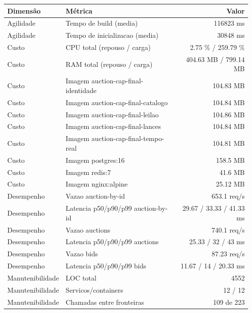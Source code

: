 \begin{quadro}[htb]
  \centering
  \caption{Métricas (auction, capacidade-negocio, snapshot-final).}
  \label{qua:metricas-auction-capacidade-negocio-snapshot-final}
  \renewcommand{\arraystretch}{1.15}
  \begin{tabular}{|l|l|r|}
    \hline
    \textbf{Dimensão} & \textbf{Métrica} & \textbf{Valor} \\
    \hline
    Agilidade & Tempo de build (media) & 116823 ms \\ \hline
    Agilidade & Tempo de inicializacao (media) & 30848 ms \\ \hline
    Custo & CPU total (repouso / carga) & 2.75 \% / 259.79 \% \\ \hline
    Custo & RAM total (repouso / carga) & 404.63 MB / 799.14 MB \\ \hline
    Custo & Imagem auction-cap-final-identidade & 104.83 MB \\ \hline
    Custo & Imagem auction-cap-final-catalogo & 104.84 MB \\ \hline
    Custo & Imagem auction-cap-final-leilao & 104.86 MB \\ \hline
    Custo & Imagem auction-cap-final-lances & 104.84 MB \\ \hline
    Custo & Imagem auction-cap-final-tempo-real & 104.81 MB \\ \hline
    Custo & Imagem postgres:16 & 158.5 MB \\ \hline
    Custo & Imagem redis:7 & 41.6 MB \\ \hline
    Custo & Imagem nginx:alpine & 25.12 MB \\ \hline
    Desempenho & Vazao auction-by-id & 653.1 req/s \\ \hline
    Desempenho & Latencia p50/p90/p99 auction-by-id & 29.67 / 33.33 / 41.33 ms \\ \hline
    Desempenho & Vazao auctions & 740.1 req/s \\ \hline
    Desempenho & Latencia p50/p90/p99 auctions & 25.33 / 32 / 43 ms \\ \hline
    Desempenho & Vazao bids & 87.23 req/s \\ \hline
    Desempenho & Latencia p50/p90/p99 bids & 11.67 / 14 / 20.33 ms \\ \hline
    Manutenibilidade & LOC total & 4552 \\ \hline
    Manutenibilidade & Servicos/containers & 12 / 12 \\ \hline
    Manutenibilidade & Chamadas entre fronteiras & 109 de 223 \\ \hline
  \end{tabular}
\end{quadro}
